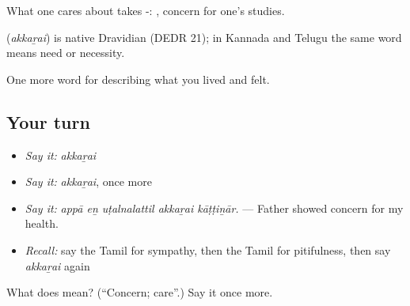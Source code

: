 What one cares about takes -:  , concern for one’s studies.

\begin{cousinweb}
\textbf{} (\emph{akkaṟai}) is native Dravidian (DEDR 21); in Kannada and Telugu the same word means need or necessity.
\end{cousinweb}

\begin{grammarlens}[title={What you've built}]
One more word for describing what you lived and felt.
\end{grammarlens}

\subsection*{Your turn}
\begin{itemize}
\raggedright
  \item \emph{Say it:} \emph{akkaṟai}
  \item \emph{Say it:} \emph{akkaṟai}, once more
  \item \emph{Say it:} \emph{appā eṉ uṭalnalattil akkaṟai kāṭṭiṉār.} — Father showed concern for my health.
  \item \emph{Recall:} say the Tamil for sympathy, then the Tamil for pitifulness, then say \emph{akkaṟai} again
\end{itemize}

\begin{tcolorbox}[breakable,colback=teal!4,colframe=teal!35!black,title={Before you move on}]
What does  mean? (\textquotedblleft{}Concern; care\textquotedblright{}.) Say it once more.
\end{tcolorbox}
